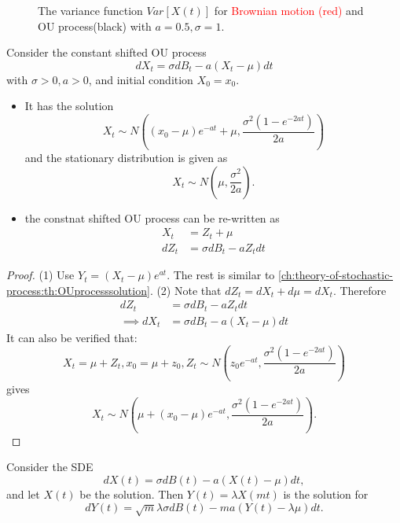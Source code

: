\begin{refsection}
\begin{figure}
	\centering
	\caption{The variance function $Var[X(t)]$ for \textcolor{red}{Brownian motion (red)} and OU process(black) with $a=0.5, \sigma=1$.}
\end{figure}


\begin{lemma}
	Consider the constant shifted OU process
	$$dX_t = \sigma dB_t - a(X_t - \mu) dt$$
	with $\sigma > 0, a > 0$, and initial condition $X_0 = x_0$.
	\begin{itemize}
		\item It has the solution 
		$$X_t \sim N((x_0-\mu) e^{-at} + \mu, \frac{\sigma^2(1- e^{-2at})}{2a})$$
		and the stationary distribution is given as
		$$X_t \sim N(\mu, \frac{\sigma^2}{2a}).$$
		\item the constnat shifted OU process can be re-written as
		\begin{align*}
		X_t & = Z_t + \mu \\
		dZ_t &= \sigma dB_t - a Z_t dt
		\end{align*} 
	\end{itemize}	
\end{lemma}
\begin{proof}
	(1)	Use $Y_t = (X_t - \mu)e^{at}$. The rest is similar to \autoref{ch:theory-of-stochastic-process:th:OUprocesssolution}.
	(2) Note that $dZ_t = dX_t + d\mu = dX_t$. Therefore
	\begin{align*}
	dZ_t &= \sigma dB_t - a Z_t dt \\
	\implies dX_t &= \sigma dB_t - a (X_t - \mu) dt 
	\end{align*}
	It can also be verified that:
	$$X_t = \mu + Z_t, x_0 = \mu + z_0,  Z_t \sim N(z_0 e^{-at}, \frac{\sigma^2(1- e^{-2at})}{2a})$$
	gives
	$$X_t  \sim N(\mu + (x_0-\mu) e^{-at}, \frac{\sigma^2(1- e^{-2at})}{2a}).$$
\end{proof}


\begin{lemma}
	Consider the SDE	
	$$dX(t) = \sigma dB(t) - a(X(t) - \mu) dt,$$
	and let $X(t)$ be the solution. Then
	$Y(t) = \lambda X(mt)$	is the solution for
	$$dY(t) = \sqrt{m}\lambda\sigma dB(t) - ma(Y(t) - \lambda\mu) dt.$$
	

\end{lemma}
\end{refsection}
